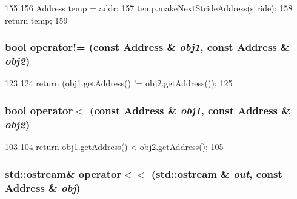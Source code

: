 \begin{DoxyCode}
155 {
156     Address temp = addr;
157     temp.makeNextStrideAddress(stride);
158     return temp;
159 }
\end{DoxyCode}
\hypertarget{Address_8hh_aec2dc78d4294b4b41e21213912217910}{
\subsubsection[{operator!=}]{\setlength{\rightskip}{0pt plus 5cm}bool operator!= (const {\bf Address} \& {\em obj1}, \/  const {\bf Address} \& {\em obj2})}}
\label{Address_8hh_aec2dc78d4294b4b41e21213912217910}



\begin{DoxyCode}
123 {
124     return (obj1.getAddress() != obj2.getAddress());
125 }
\end{DoxyCode}
\hypertarget{Address_8hh_a89baa7226ba91f27a54feb1d4fdbfff9}{
\subsubsection[{operator$<$}]{\setlength{\rightskip}{0pt plus 5cm}bool operator$<$ (const {\bf Address} \& {\em obj1}, \/  const {\bf Address} \& {\em obj2})}}
\label{Address_8hh_a89baa7226ba91f27a54feb1d4fdbfff9}



\begin{DoxyCode}
103 {
104     return obj1.getAddress() < obj2.getAddress();
105 }
\end{DoxyCode}
\hypertarget{Address_8hh_a23e54ef4a14e8ac62c034d786463d167}{
\subsubsection[{operator$<$$<$}]{\setlength{\rightskip}{0pt plus 5cm}std::ostream\& operator$<$$<$ (std::ostream \& {\em out}, \/  const {\bf Address} \& {\em obj})}}
\label{Address_8hh_a23e54ef4a14e8ac62c034d786463d167}



